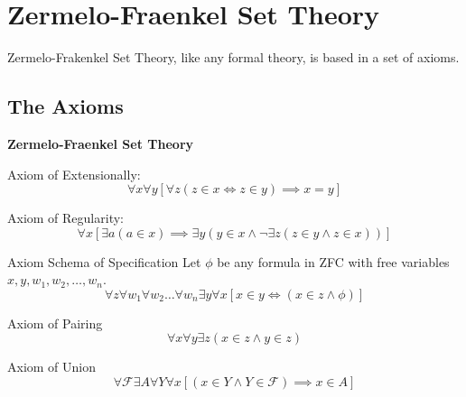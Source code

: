 \section{Zermelo-Fraenkel Set Theory}

Zermelo-Frakenkel Set Theory, like any formal theory, is based in a set of axioms.

\subsection{The Axioms}
\begin{axiomset}
    \textbf{Zermelo-Fraenkel Set Theory}
    \begin{axiom}
        Axiom of Extensionally:
        \begin{equation}
          \forall x \forall y [ \forall z ( z \in x \Leftrightarrow z \in y) \implies x = y ]
        \end{equation}
    \end{axiom}
    \begin{axiom}
        Axiom of Regularity:
        \begin{equation}
          \forall x [ \exists a ( a \in x ) \implies \exists y ( y \in x \land \neg \exists z ( z \in y \land z \in x ))]
        \end{equation}
    \end{axiom}
    \begin{axiom}
        Axiom Schema of Specification
        Let $\phi$ be any formula in ZFC with free variables $x, y, w_1, w_2, \ldots, w_n$.
        \begin{equation}
            \forall z \forall w_1 \forall w_2 \ldots \forall w_n \exists y \forall x [ x \in y \Leftrightarrow (x \in z \land \phi) ]
        \end{equation}
    \end{axiom}
    \begin{axiom}
        Axiom of Pairing
        \begin{equation}
            \forall x \forall y \exists z (x \in z \land y \in z)
        \end{equation}
    \end{axiom}
    \begin{axiom}
        Axiom of Union
        \begin{equation}
        \forall \mathcal{F} \exists A \forall Y \forall x [(x \in Y \land Y \in \mathcal{F}) \implies x \in A]
        \end{equation}
    \end{axiom}

\end{axiomset}
